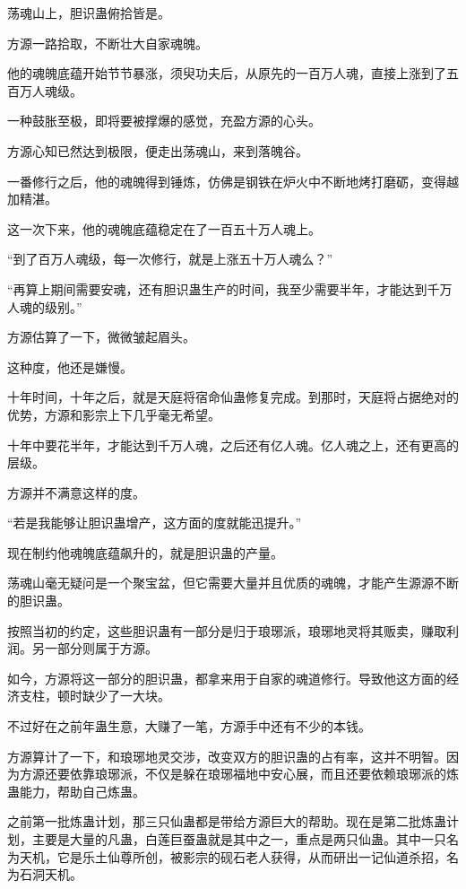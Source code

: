 
\begin{this_body}

荡魂山上，胆识蛊俯拾皆是。

方源一路拾取，不断壮大自家魂魄。

他的魂魄底蕴开始节节暴涨，须臾功夫后，从原先的一百万人魂，直接上涨到了五百万人魂级。

一种鼓胀至极，即将要被撑爆的感觉，充盈方源的心头。

方源心知已然达到极限，便走出荡魂山，来到落魄谷。

一番修行之后，他的魂魄得到锤炼，仿佛是钢铁在炉火中不断地烤打磨砺，变得越加精湛。

这一次下来，他的魂魄底蕴稳定在了一百五十万人魂上。

“到了百万人魂级，每一次修行，就是上涨五十万人魂么？”

“再算上期间需要安魂，还有胆识蛊生产的时间，我至少需要半年，才能达到千万人魂的级别。”

方源估算了一下，微微皱起眉头。

这种度，他还是嫌慢。

十年时间，十年之后，就是天庭将宿命仙蛊修复完成。到那时，天庭将占据绝对的优势，方源和影宗上下几乎毫无希望。

十年中要花半年，才能达到千万人魂，之后还有亿人魂。亿人魂之上，还有更高的层级。

方源并不满意这样的度。

“若是我能够让胆识蛊增产，这方面的度就能迅提升。”

现在制约他魂魄底蕴飙升的，就是胆识蛊的产量。

荡魂山毫无疑问是一个聚宝盆，但它需要大量并且优质的魂魄，才能产生源源不断的胆识蛊。

按照当初的约定，这些胆识蛊有一部分是归于琅琊派，琅琊地灵将其贩卖，赚取利润。另一部分则属于方源。

如今，方源将这一部分的胆识蛊，都拿来用于自家的魂道修行。导致他这方面的经济支柱，顿时缺少了一大块。

不过好在之前年蛊生意，大赚了一笔，方源手中还有不少的本钱。

方源算计了一下，和琅琊地灵交涉，改变双方的胆识蛊的占有率，这并不明智。因为方源还要依靠琅琊派，不仅是躲在琅琊福地中安心展，而且还要依赖琅琊派的炼蛊能力，帮助自己炼蛊。

之前第一批炼蛊计划，那三只仙蛊都是带给方源巨大的帮助。现在是第二批炼蛊计划，主要是大量的凡蛊，白莲巨蚕蛊就是其中之一，重点是两只仙蛊。其中一只名为天机，它是乐土仙尊所创，被影宗的砚石老人获得，从而研出一记仙道杀招，名为石洞天机。


\end{this_body}
